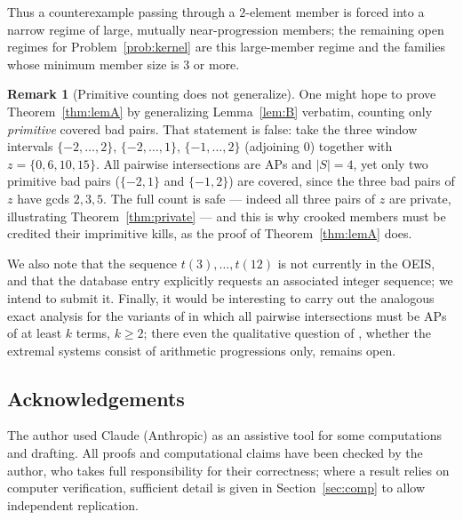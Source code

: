 \documentclass[11pt]{article}
\theoremstyle{definition}
\newtheorem{remark}[theorem]{Remark}
\begin{document}
Thus a counterexample passing through a $2$-element member is forced into a narrow regime of large, mutually near-progression members; the remaining open regimes for Problem~\ref{prob:kernel} are this large-member regime and the families whose minimum member size is $3$ or more.

\begin{remark}[Primitive counting does not generalize]\label{rem:cex}
One might hope to prove Theorem~\ref{thm:lemA} by generalizing Lemma~\ref{lem:B} verbatim, counting only \emph{primitive} covered bad pairs. That statement is false: take the three window intervals $\{-2,\dots,2\}$, $\{-2,\dots,1\}$, $\{-1,\dots,2\}$ (adjoining $0$) together with $z=\{0,6,10,15\}$. All pairwise intersections are APs and $|S|=4$, yet only two primitive bad pairs ($\{-2,1\}$ and $\{-1,2\}$) are covered, since the three bad pairs of $z$ have gcds $2,3,5$. The full count is safe --- indeed all three pairs of $z$ are private, illustrating Theorem~\ref{thm:private} --- and this is why crooked members must be credited their imprimitive kills, as the proof of Theorem~\ref{thm:lemA} does.
\end{remark}

We also note that the sequence $t(3),\dots,t(12)$ is not currently in the OEIS, and that the database entry \cite{EP272} explicitly requests an associated integer sequence; we intend to submit it. Finally, it would be interesting to carry out the analogous exact analysis for the variants of \cite{SiSo81} in which all pairwise intersections must be APs of at least $k$ terms, $k\ge2$; there even the qualitative question of \cite{SiSo81,Sz99}, whether the extremal systems consist of arithmetic progressions only, remains open.

\subsection*{Acknowledgements}
The author used Claude (Anthropic) as an assistive tool for some computations and drafting. All proofs and computational claims have been checked by the author, who takes full responsibility for their correctness; where a result relies on computer verification, sufficient detail is given in Section~\ref{sec:comp} to allow independent replication.



\end{document}
